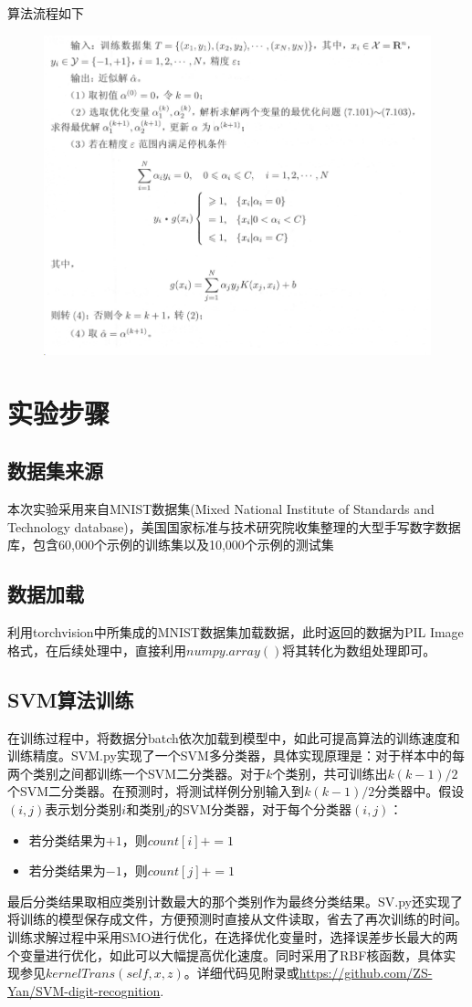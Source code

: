 \documentclass{progartcn}
\begin{document}
算法流程如下
\begin{figure}[H]
	\centering
	\includegraphics[width=0.7\linewidth]{screenshot002}
	\label{fig:screenshot002}
\end{figure}

\section{实验步骤}
\subsection{数据集来源}
本次实验采用来自MNIST数据集(Mixed National Institute of Standards and Technology database)，美国国家标准与技术研究院收集整理的大型手写数字数据库，包含60,000个示例的训练集以及10,000个示例的测试集
\subsection{数据加载}
利用torchvision中所集成的MNIST数据集加载数据，此时返回的数据为PIL Image格式，在后续处理中，直接利用$numpy.array()$将其转化为数组处理即可。

\subsection{SVM算法训练}
在训练过程中，将数据分batch依次加载到模型中，如此可提高算法的训练速度和训练精度。SVM.py实现了一个SVM多分类器，具体实现原理是：对于样本中的每两个类别之间都训练一个SVM二分类器。对于$k$个类别，共可训练出$k(k-1)/2$个SVM二分类器。在预测时，将测试样例分别输入到$k(k-1)/2$分类器中。假设$(i,j)$表示划分类别$i$和类别$j$的SVM分类器，对于每个分类器$(i,j)$：
\begin{itemize}
	\item 若分类结果为$+1$，则$count[i] +=1$
	\item 若分类结果为$-1$，则$count[j] +=1$
\end{itemize}
最后分类结果取相应类别计数最大的那个类别作为最终分类结果。SV.py还实现了将训练的模型保存成文件，方便预测时直接从文件读取，省去了再次训练的时间。训练求解过程中采用SMO进行优化，在选择优化变量时，选择误差步长最大的两个变量进行优化，如此可以大幅提高优化速度。同时采用了RBF核函数，具体实现参见$kernelTrans(self,x,z)$。详细代码见附录或\url{https://github.com/ZS-Yan/SVM-digit-recognition}.
\end{document}
